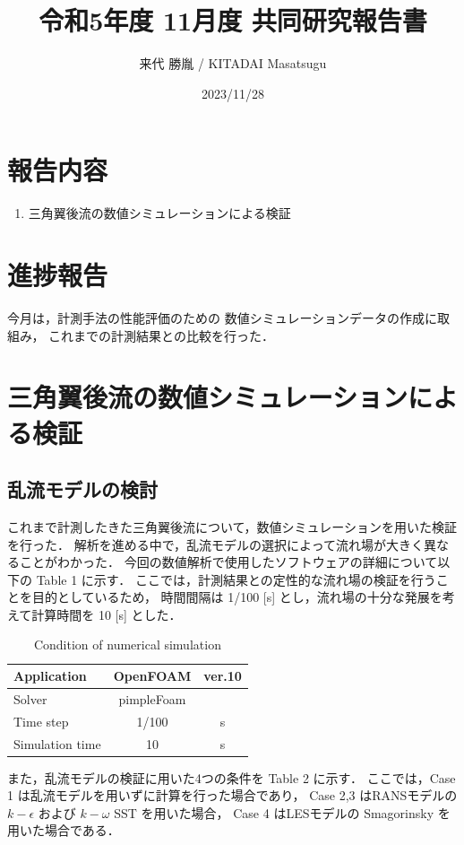\documentclass[twocolumn,a4j]{jsarticle}
\author{来代 勝胤 / KITADAI Masatsugu}
\title{令和5年度 11月度 共同研究報告書}
\date{2023/11/28}
\begin{document}
\columnseprule=0.1mm
\maketitle

\section*{報告内容}
\begin{enumerate}[1.]
	\item 三角翼後流の数値シミュレーションによる検証
\end{enumerate}

\section*{進捗報告}
今月は，計測手法の性能評価のための
数値シミュレーションデータの作成に取組み，
これまでの計測結果との比較を行った．

\section{三角翼後流の数値シミュレーションによる検証}
\subsection{乱流モデルの検討}
これまで計測したきた三角翼後流について，数値シミュレーションを用いた検証を行った．
解析を進める中で，乱流モデルの選択によって流れ場が大きく異なることがわかった．
今回の数値解析で使用したソフトウェアの詳細について以下の Table 1 に示す．
ここでは，計測結果との定性的な流れ場の検証を行うことを目的としているため，
時間間隔は 1/100 [s] とし，流れ場の十分な発展を考えて計算時間を 10 [s] とした．

\begin{table}[hbtp]
	\centering
	\caption{Condition of numerical simulation}
	\begin{tabular}{l c c}
		\hline
		Application     & OpenFOAM   & ver.10 \\ \hline
		Solver          & pimpleFoam          \\ \hline
		Time step       & 1/100      & s      \\ \hline
		Simulation time & 10         & s      \\ \hline
	\end{tabular}
\end{table}

また，乱流モデルの検証に用いた4つの条件を Table 2 に示す．
ここでは，Case 1 は乱流モデルを用いずに計算を行った場合であり，
Case 2,3 はRANSモデルの $k-\epsilon$ および $k-\omega$ SST を用いた場合，
Case 4 はLESモデルの Smagorinsky を用いた場合である．
\end{document}
